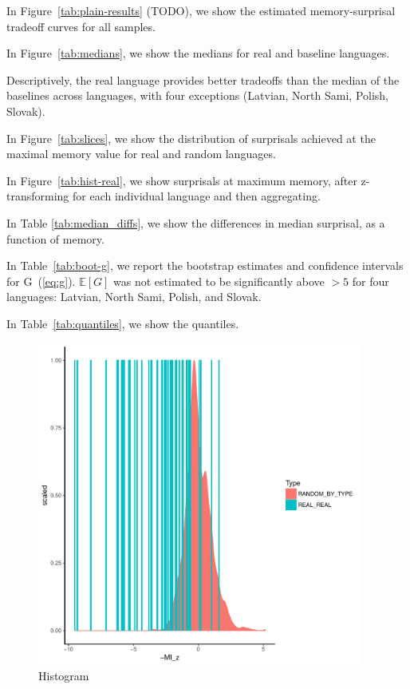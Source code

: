 \documentclass[11pt,letterpaper]{article}
\newcommand{\E}[0]{\mathbb{E}}
\begin{document}
In Figure~\ref{tab:plain-results} (TODO), we show the estimated memory-surprisal tradeoff curves for all samples.

In Figure~\ref{tab:medians}, we show the medians for real and baseline languages.

Descriptively, the real language provides better tradeoffs than the median of the baselines across languages, with four exceptions (Latvian, North Sami, Polish, Slovak).

In Figure~\ref{tab:slices}, we show the distribution of surprisals achieved at the maximal memory value for real and random languages.

In Figure~\ref{tab:hist-real}, we show surprisals at maximum memory, after z-transforming for each individual language and then aggregating.

In Table \ref{tab:median_diffs}, we show the differences in median surprisal, as a function of memory.


In Table~\ref{tab:boot-g}, we report the bootstrap estimates and confidence intervals for G~(\ref{eq:g}).
$\E[G]$ was not estimated to be significantly above $>5$ for four languages: Latvian, North Sami, Polish, and Slovak.


In Table~\ref{tab:quantiles}, we show the quantiles.



\begin{figure}
\includegraphics[width=0.95\textwidth]{neural/figures/full-REAL-listener-surprisal-memory-HIST_z_byMem_onlyWordForms_boundedVocab.pdf}
\caption{Histogram}\label{fig:hist-real}
\end{figure}
\end{document}
